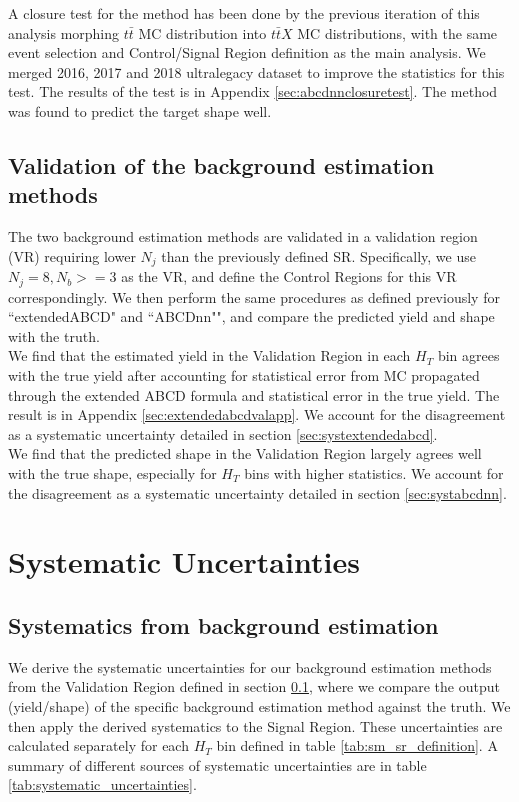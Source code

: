 \documentclass[twoside]{article}
\begin{document}
A closure test for the method has been done by the previous iteration of this analysis morphing $t\bar{t}$ MC distribution into $t\bar{t}X$ MC distributions, with the same event selection and Control/Signal Region definition as the main analysis. We merged 2016, 2017 and 2018 ultralegacy dataset to improve the statistics for this test. The results of the test is in Appendix \ref{sec:abcdnnclosuretest}. The method was found to predict the target shape well.  \\

\subsection{Validation of the background estimation methods}
\label{sec:validationregion}
The two background estimation methods are validated in a validation region (VR) requiring lower $N_j$ than the previously defined SR. Specifically, we use $N_j=8, N_b>=3$ as the VR, and define the Control Regions for this VR correspondingly. We then perform the same procedures as defined previously for ``extendedABCD" and ``ABCDnn"", and compare the predicted yield and shape with the truth. \\

We find that the estimated yield in the Validation Region in each $H_T$ bin agrees with the true yield after accounting for statistical error from MC propagated through the extended ABCD formula and statistical error in the true yield. The result is in Appendix \ref{sec:extendedabcdvalapp}. We account for the disagreement as a systematic uncertainty detailed in section \ref{sec:systextendedabcd}.\\

We find that the predicted shape in the Validation Region largely agrees well with the true shape, especially for $H_T$ bins with higher statistics. We account for the disagreement as a systematic uncertainty detailed in section \ref{sec:systabcdnn}. 


\clearpage
\section{Systematic Uncertainties}
\label{sec:syst}
\subsection{Systematics from background estimation}
We derive the systematic uncertainties for our background estimation methods from the Validation Region defined in section \ref{sec:validationregion}, where we compare the output (yield/shape) of the specific background estimation method against the truth. We then apply the derived systematics to the Signal Region. These uncertainties are calculated separately for each $H_T$ bin defined in table \ref{tab:sm_sr_definition}. A summary of different sources of systematic uncertainties are in table \ref{tab:systematic_uncertainties}.
\end{document}
